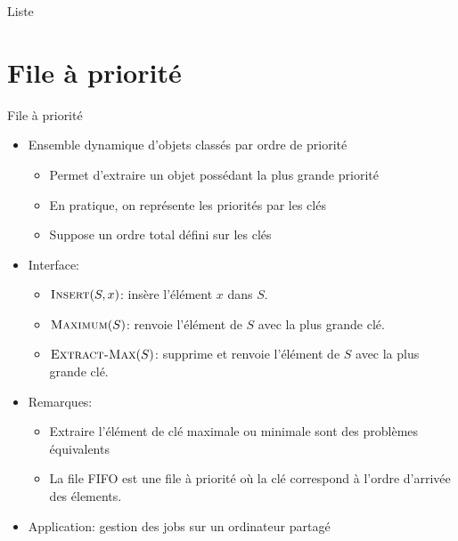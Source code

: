 \begin{frame}{Liste}
\end{frame}

\section{File à priorité}


\begin{frame}{File à priorité}
\begin{itemize}
\item Ensemble dynamique d'objets classés par ordre de \alert{priorité}
\begin{itemize}
\item Permet d'extraire un objet possédant la plus grande priorité
\item En pratique, on représente les priorités par les clés
\item Suppose un ordre total défini sur les clés
\end{itemize}
\item Interface:
\begin{itemize}
\item $\textnormal{\scshape Insert}(S,x)$: insère l'élément $x$ dans $S$.
\item $\textnormal{\scshape Maximum}(S)$: renvoie l'élément de $S$ avec la plus grande clé.
\item $\textnormal{\scshape Extract-Max}(S)$: supprime et renvoie l'élément de $S$ avec la plus grande clé.

\end{itemize}
\item Remarques:
\begin{itemize}
\item Extraire l'élément de clé maximale ou minimale sont des problèmes équivalents
\item La file FIFO est une file à priorité où la clé correspond à l'ordre d'arrivée des élements.
\end{itemize}
\item Application: gestion des jobs sur un ordinateur partagé
\end{itemize}
\end{frame}

